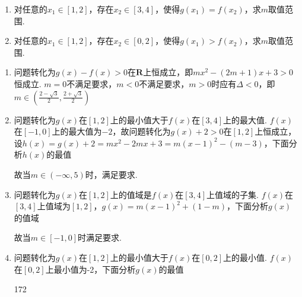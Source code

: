 \begin{enumerate}
\begin{enumerate}
\begin{enumerate}[1.]
            \item 对任意的$x_1 \in [1, 2]$，存在$x_2 \in [3, 4]$，使得$g(x_1) = f(x_2)$，求$m$取值范围.
            \item 对任意的$x_1 \in [1, 2]$，存在$x_2 \in [0, 2]$，使得$g(x_1) > f(x_2)$，求$m$取值范围.
        \end{enumerate}
        \begin{jieda}
            \begin{enumerate}[1.]
                \item 问题转化为$g(x) - f(x) > 0$在$\mathbf{R}$上恒成立，即$mx^2-(2m+1)x+3 > 0$恒成立. $m = 0$不满足要求，$m < 0$不满足要求，$m > 0$时应有$\Delta < 0$，即$m \in (\frac{2-\sqrt{3}}{2}, \frac{2+\sqrt{3}}{2})$
                \item 问题转化为$g(x)$在$[1, 2]$上的最小值大于$f(x)$在$[3, 4]$上的最大值. $f(x)$在$[-1, 0]$上的最大值为$-2$，故问题转化为$g(x) + 2 > 0$在$[1, 2]$上恒成立，设$h(x) = g(x) + 2 = mx^2-2mx + 3 = m(x-1)^2-(m-3)$，下面分析$h(x)$的最值
                故当$m \in (-\infty, 5)$时，满足要求.
                \item 问题转化为$g(x)$在$[1, 2]$上的值域是$f(x)$在$[3, 4]$上值域的子集. $f(x)$在$[3, 4]$上值域为$[1, 2]$，$g(x) = m(x-1)^2 + (1-m)$，下面分析$g(x)$的值域
                故当$m \in [-1, 0]$时满足要求.
                \item 问题转化为$g(x)$在$[1, 2]$上的最小值大于$f(x)$在$[0, 2]$上的最小值. $f(x)$在$[0, 2]$上最小值为-2，下面分析$g(x)$的最值
                \begin{dingautolist}{172}

\end{dingautolist}
\end{enumerate}
\end{jieda}
\end{enumerate}
\end{enumerate}

